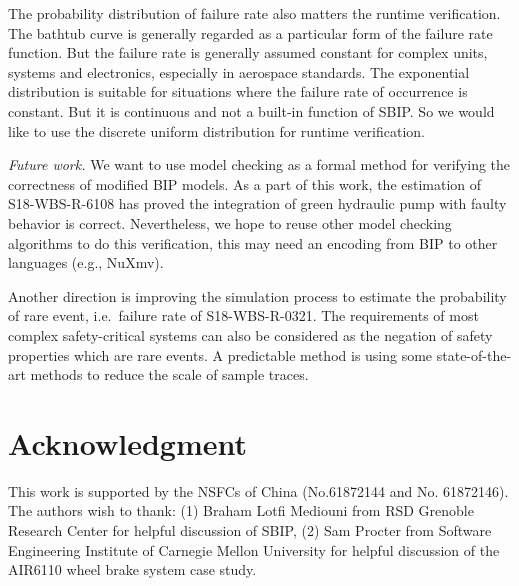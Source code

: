 \documentclass[runningheads]{llncs}
\begin{document}
The probability distribution of failure rate also matters the runtime verification. The bathtub curve is generally regarded as a particular form of the failure rate function. But the failure rate is generally assumed constant for complex units, systems and electronics, especially in aerospace standards. The exponential distribution is suitable for situations where the failure rate of occurrence is constant. But it is continuous and not a built-in function of SBIP. So we would like to use the discrete uniform distribution for runtime verification.

\emph{Future work.}  We want to use model checking as a formal method for verifying the correctness of modified BIP models. As a part of this work, the estimation of S18-WBS-R-6108 has proved the integration of green hydraulic pump with faulty behavior is correct. Nevertheless, we hope to reuse other model checking algorithms to do this verification, this may need an encoding from BIP to other languages (e.g., NuXmv).

Another direction is improving the simulation process to estimate the probability of rare event, i.e.\ failure rate of S18-WBS-R-0321. The requirements of most complex safety-critical systems can also be considered as the negation of safety properties which are rare events. A predictable method is using some state-of-the-art methods\cite{rarevent1,rarevent2} to reduce the scale of sample traces.

\section*{Acknowledgment}

This work is supported by the NSFCs of China (No.61872144 and No. 61872146). The authors wish to thank: (1) Braham Lotfi Mediouni from RSD Grenoble Research Center for helpful discussion of SBIP, (2) Sam Procter from Software Engineering Institute of Carnegie Mellon University for helpful discussion of the AIR6110 wheel brake system case study.

%
%
%
% 
% 
%



\end{document}
